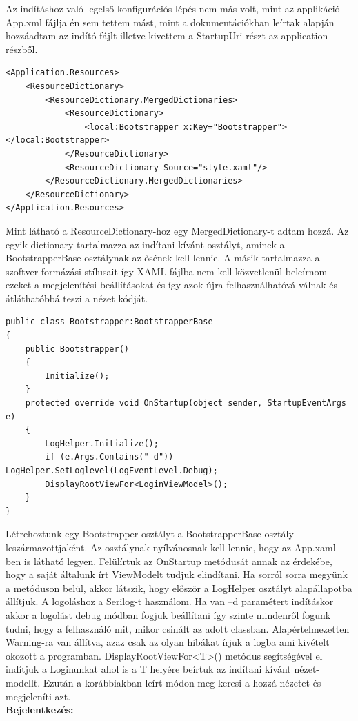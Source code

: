 \documentclass[
]{thesis-ekf}
\theoremstyle{definition}
\theoremstyle{remark}
\begin{document}
Az indításhoz való legelső konfigurációs lépés nem más volt, mint az applikáció App.xml fájlja én sem tettem mást, mint a dokumentációkban leírtak alapján hozzáadtam az indító fájlt illetve kivettem a StartupUri részt az application részből.
\begin{lstlisting}[caption={App.xml},captionpos=b]
<Application.Resources>
	<ResourceDictionary>
		<ResourceDictionary.MergedDictionaries>
			<ResourceDictionary>
				<local:Bootstrapper x:Key="Bootstrapper"></local:Bootstrapper>
			</ResourceDictionary>
			<ResourceDictionary Source="style.xaml"/>
		</ResourceDictionary.MergedDictionaries>
	</ResourceDictionary>        
</Application.Resources>
\end{lstlisting}
Mint látható a ResourceDictionary-hoz egy MergedDictionary-t adtam hozzá. Az egyik dictionary tartalmazza az indítani kívánt osztályt, aminek a BootstrapperBase osztálynak az ősének kell lennie. A másik tartalmazza a szoftver formázási stílusait így XAML fájlba nem kell közvetlenül beleírnom ezeket a megjelenítési beállításokat és így azok újra felhasználhatóvá válnak és átláthatóbbá teszi a nézet kódját.
\begin{lstlisting}[caption={Indításért felelős osztály},captionpos=b]
public class Bootstrapper:BootstrapperBase
{
	public Bootstrapper()
	{
		Initialize();
	}
	protected override void OnStartup(object sender, StartupEventArgs e)
	{
		LogHelper.Initialize();
		if (e.Args.Contains("-d")) LogHelper.SetLoglevel(LogEventLevel.Debug);
		DisplayRootViewFor<LoginViewModel>();
	}
}

\end{lstlisting}
Létrehoztunk egy Bootstrapper osztályt a BootstrapperBase osztály leszármazottjaként. Az osztálynak nyílvánosnak kell lennie, hogy az App.xaml-ben is látható legyen. Felülírtuk az OnStartup metódusát annak az érdekébe, hogy a saját általunk írt ViewModelt tudjuk elindítani. Ha sorról sorra megyünk a metóduson belül, akkor látszik, hogy először a LogHelper osztályt alapállapotba állítjuk. A logoláshoz a Serilog-t használom. Ha van –d paramétert indításkor akkor a logolást debug módban fogjuk beállítani így szinte mindenről fogunk tudni, hogy a felhasználó mit, mikor csinált az adott classban. Alapértelmezetten Warning-ra van állítva, azaz csak az olyan hibákat írjuk a logba ami kivételt okozott a programban. DisplayRootViewFor<T>() metódus segítségével el indítjuk a Loginunkat ahol is a T helyére beírtuk az indítani kívánt nézet-modellt. Ezután a korábbiakban leírt módon meg keresi a hozzá nézetet és megjeleníti azt.\\
\textbf{Bejelentkezés:}
\end{document}
